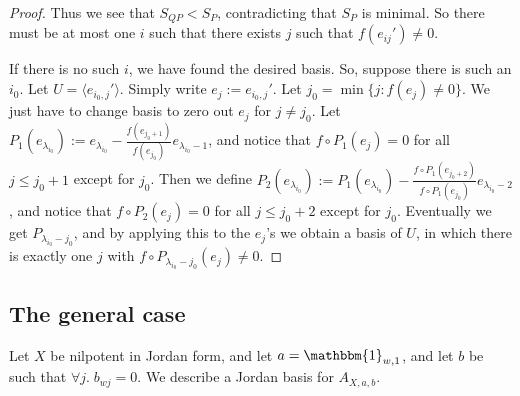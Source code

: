 \documentclass[12pt,psamsfonts]{article}
\begin{document}
\begin{proof}
    Thus we see that \(S_{QP} < S_P\), contradicting that \(S_P\) is minimal.
    So there must be at most one \(i\) such that there exists \(j\) such that \(f(e_{ij}') \neq 0\).
    \par If there is no such \(i\), we have found the desired basis.
    So, suppose there is such an \(i_0\).
    Let \(U = \langle e_{i_0, j}' \rangle\).
    Simply write \(e_j := e_{i_0, j}'\).
    Let \(j_0 = \min\{j : f(e_j) \neq 0\}\).
    We just have to change basis to zero out \(e_j\) for \(j \neq j_0\).
    Let \(P_1(e_{\lambda_{i_0}}) := e_{\lambda_{i_0}} - \frac{f(e_{j_0 + 1})}{f(e_{j_0})} e_{\lambda_{i_0} - 1}\), and notice that \(f \circ P_1(e_j) = 0\) for all \(j \leq j_0 + 1\) except for \(j_0\).
    Then we define \(P_2(e_{\lambda_{i_0}}) := P_1(e_{\lambda_{i_0}}) - \frac{f\circ P_1(e_{j_0 + 2})}{f\circ P_1(e_{j_0})} e_{\lambda_{i_0} - 2}\), and notice that \(f \circ P_2(e_j) = 0\) for all \(j \leq j_0 + 2\) except for \(j_0\).    
    Eventually we get \(P_{\lambda_{i_0} - j_0}\), and by applying this to the \(e_j\)'s we obtain a basis of \(U\), in which there is exactly one \(j\) with \(f \circ P_{\lambda_{i_0} - j_0}(e_j) \neq 0\).
\end{proof}

\subsection{The general case}
Let \(X\) be nilpotent in Jordan form, and let \(a = \mathbbm{1}_{w,1}\), and let \(b\) be such that \(\forall j. \; b_{wj} = 0\).
We describe a Jordan basis for \(A_{X, a, b}\).
\end{document}
